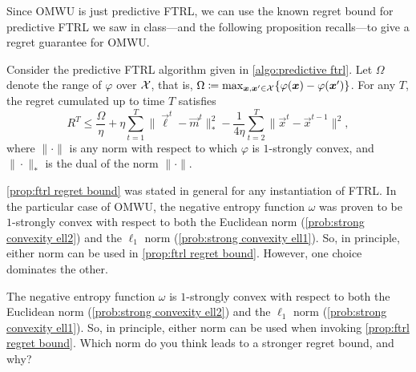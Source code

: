 \documentclass{homework}
\newcommand{\negent}{\omega}
\begin{document}
Since OMWU is just predictive FTRL, we can use the known regret bound for predictive FTRL we saw in class---and the following proposition recalls---to give a regret guarantee for OMWU. 

\begin{proposition}\label{prop:ftrl regret bound}
    Consider the predictive FTRL algorithm given in \cref{algo:predictive ftrl}. Let $\Omega$ denote the range of $\varphi$ over $\mathcal{X}$, that is, $\Omega \coloneqq \max_{\bm{x},\bm{x}'\in\mathcal{X}} \{\varphi(\bm{x}) - \varphi(\bm{x}')\}$. For any $T$, the regret cumulated up to time $T$ satisfies
    \begin{equation*}
        R^T \le \frac{\Omega}{\eta} + \eta\sum_{t=1}^T \|\vec{\ell}^t - \vec{m}^t\|_*^2 - \frac{1}{4\eta} \sum_{t=2}^{T} \|\vec{x}^{t} - \vec{x}^{t-1}\|^2,
    \end{equation*}
    where $\|\cdot\|$ is any norm with respect to which $\varphi$ is $1$-strongly convex, and $\|\cdot\|_*$ is the dual of the norm $\|\cdot\|$.
\end{proposition}

\cref{prop:ftrl regret bound} was stated in general for any instantiation of FTRL. In the particular case of OMWU, the negative entropy function $\negent$ was proven to be $1$-strongly convex with respect to both the Euclidean norm (\cref{prob:strong convexity ell2}) and the $\ell_1$ norm (\cref{prob:strong convexity ell1}). So, in principle, either norm can be used in \cref{prop:ftrl regret bound}. However, one choice dominates the other.

\begin{problem}[2 points]
    The negative entropy function $\negent$ is $1$-strongly convex with respect to both the Euclidean norm (\cref{prob:strong convexity ell2}) and the $\ell_1$ norm (\cref{prob:strong convexity ell1}). So, in principle, either norm can be used when invoking \cref{prop:ftrl regret bound}. Which norm do you think leads to a stronger regret bound, and why?
\end{problem}
\begin{solution}
\end{solution}
\end{document}
